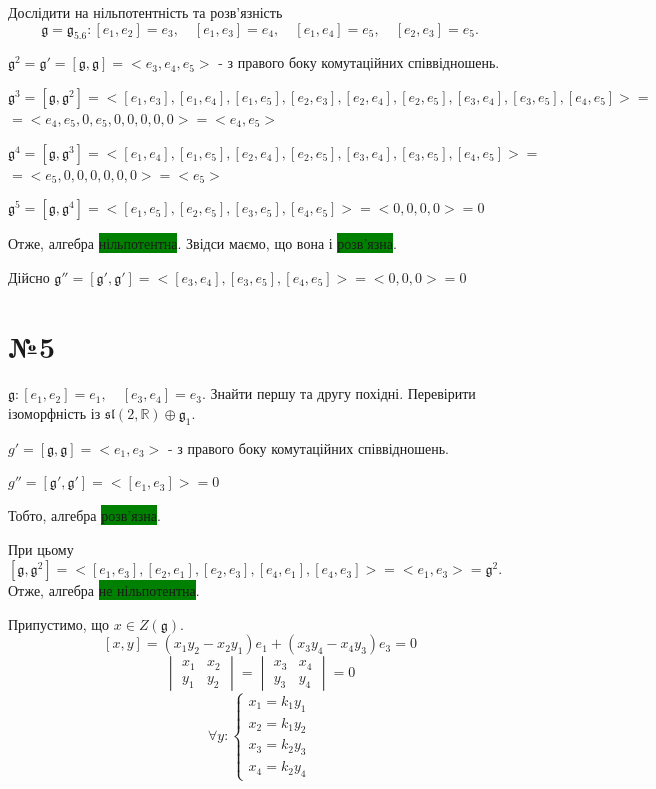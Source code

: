 \documentclass[10pt, a4paper]{article} %
\newcommand{\R}{\mathbb{R}}
\newcommand{\g}{\mathfrak{g}}
\begin{document}
\begin{mdframed}
    Дослідити на нільпотентність та розв'язність
    \[\g = \g_{5.6} : [e_1,e_2] = e_3, \quad [e_1,e_3]=e_4, \quad [e_1,e_4]=e_5, \quad [e_2,e_3]=e_5.\]
\end{mdframed}

$\g^2 = \g' = [\g,\g] = <e_3,e_4,e_5>$ - з правого боку комутаційних співвідношень.

$\g^3 = [\g, \g^2] = <[e_1,e_3],[e_1,e_4],[e_1,e_5],[e_2,e_3],[e_2,e_4],[e_2,e_5],[e_3,e_4],[e_3,e_5],[e_4,e_5]> = $\\
$= <e_4, e_5, 0, e_5, 0, 0, 0, 0, 0> = <e_4,e_5>$

$\g^4 = [\g, \g^3] = <[e_1,e_4],[e_1,e_5],[e_2,e_4],[e_2,e_5],[e_3,e_4],[e_3,e_5],[e_4,e_5]> = $\\
$= <e_5,0,0,0,0,0,0> = <e_5>$

$\g^5 = [\g, \g^4] = <[e_1,e_5],[e_2,e_5],[e_3,e_5],[e_4,e_5]> = <0,0,0,0> = 0$

Отже, алгебра \colorbox{green}{нільпотентна}. Звідси маємо, що вона і \colorbox{green}{розв'язна}.

Дійсно
$\g'' = [\g',\g'] = <[e_3,e_4],[e_3,e_5],[e_4,e_5]> = <0,0,0> = 0$


\section*{№5}
\begin{mdframed}
    $\g : [e_1,e_2] = e_1, \quad [e_3,e_4]=e_3$.
    Знайти першу та другу похідні. Перевірити ізоморфність із $\mathfrak{sl}(2,\R)\oplus \g_1$.
\end{mdframed}

$g' = [\g, \g] = <e_1,e_3>$ - з правого боку комутаційних співвідношень.

$g'' = [\g',\g'] = <[e_1,e_3]> = 0$

Тобто, алгебра \colorbox{green}{розв'язна}.

При цьому 
$[\g, \g^2] = <[e_1,e_3],[e_2,e_1],[e_2,e_3],[e_4,e_1],[e_4,e_3]> = <e_1,e_3> = \g^2$.\\
Отже, алгебра \colorbox{green}{не нільпотентна}.

Припустимо, що $x \in Z(\g)$.
\[[x,y] = (x_1y_2-x_2y_1)e_1 + (x_3y_4-x_4y_3)e_3 = 0\]
\[\begin{vmatrix}
    x_1 & x_2 \\ y_1 & y_2
\end{vmatrix} = \begin{vmatrix}
    x_3 & x_4 \\ y_3 & y_4
\end{vmatrix} = 0\]
\[\forall y: \begin{cases}
    x_1 = k_1 y_1\\
    x_2 = k_1 y_2\\
    x_3 = k_2 y_3\\
    x_4 = k_2 y_4
\end{cases}\]
\end{document}
